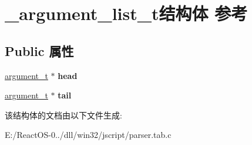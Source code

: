 \hypertarget{struct__argument__list__t}{}\section{\+\_\+argument\+\_\+list\+\_\+t结构体 参考}
\label{struct__argument__list__t}
\subsection*{Public 属性}
\begin{DoxyCompactItemize}
\item 
\mbox{\label{struct__argument__list__t_a3112fabbc89b272fd2017ba8f96593bc}} 
\hyperlink{struct__argument__t}{argument\+\_\+t} $\ast$ {\bfseries head}
\item 
\mbox{\label{struct__argument__list__t_a60e20ddf29f43762a630d1b21de86013}} 
\hyperlink{struct__argument__t}{argument\+\_\+t} $\ast$ {\bfseries tail}
\end{DoxyCompactItemize}


该结构体的文档由以下文件生成\+:\begin{DoxyCompactItemize}
\item 
E\+:/\+React\+O\+S-\/0../dll/win32/jscript/parser.\+tab.\+c\end{DoxyCompactItemize}
